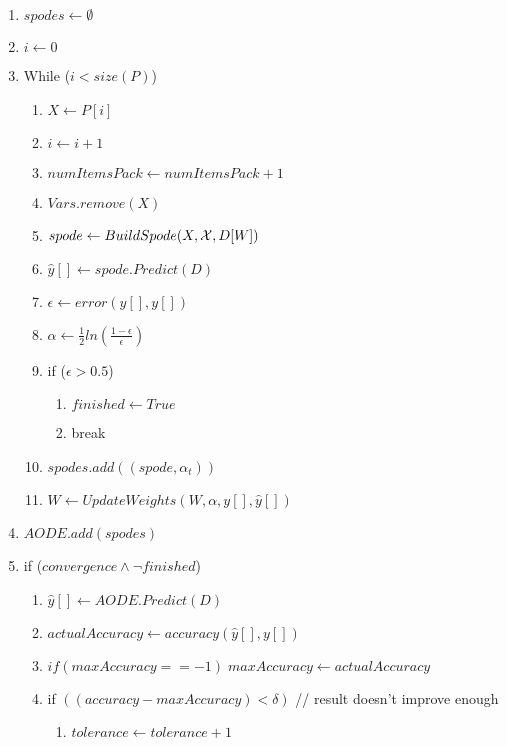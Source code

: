 \begin{enumerate}
\begin{enumerate}
    \item $spodes \leftarrow \emptyset$
    \item $i \leftarrow 0$
    \item While ($ i < size(P)$)
    \begin{enumerate}
        \item $X \leftarrow P[i]$
        \item $i \leftarrow i + 1$
        \item $numItemsPack \leftarrow numItemsPack + 1$
        \item $Vars.remove(X)$
        \item $spode \leftarrow BuildSpode(X, {\cal{X}}, D[W])$
        \item $\hat{y}[] \leftarrow spode.Predict(D)$
        \item $\epsilon \leftarrow error(\hat{y}[], y[])$
        \item $\alpha \leftarrow \frac{1}{2} ln \left ( \frac{1-\epsilon}{\epsilon} \right )$
        \item if ($\epsilon > 0.5$)
        \begin{enumerate}
            \item $finished \leftarrow True$
            \item break
        \end{enumerate}
        \item $spodes.add( (spode,\alpha_t) )$
        \item $W \leftarrow UpdateWeights(W,\alpha,y[],\hat{y}[])$
    \end{enumerate}       
    \item $AODE.add( spodes )$
    \item if ($convergence \land \lnot finished$) 
    \begin{enumerate}       
        \item $\hat{y}[] \leftarrow AODE.Predict(D)$
        \item $actualAccuracy \leftarrow accuracy(\hat{y}[], y[])$
        \item $if (maxAccuracy == -1)\; maxAccuracy \leftarrow actualAccuracy$
        \item if $((accuracy - maxAccuracy) < \delta)$\hspace*{2cm} // result doesn't improve enough
        \begin{enumerate}
            \item $tolerance \leftarrow tolerance + 1$
        \end{enumerate}

\end{enumerate}
\end{enumerate}
\end{enumerate}
